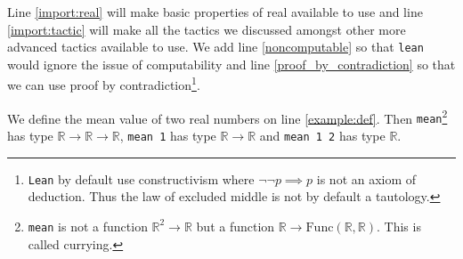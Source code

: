 \documentclass{report}
\theoremstyle{definition}
\begin{document}
Line \ref{import:real} will make basic properties of real available to use and line \ref{import:tactic} will make all the tactics we discussed amongst other more advanced tactics available to use. We add line \ref{noncomputable} so that {\tt \small lean} would ignore the issue of computability and line \ref{proof_by_contradiction} so that we can use proof by contradiction\footnote{{\tt \small Lean} by default use constructivism where $\neg\neg p\implies p$ is not an axiom of deduction. Thus the law of excluded middle is not by default a tautology.}. 

We define the mean value of two real numbers on line \ref{example:def}. Then {\tt \small mean}\footnote{{\tt \small mean} is not a function $\mathbb R^2\to\mathbb R$ but a function $\mathbb R\to\mathrm{Func}(\mathbb R,\mathbb R)$. This is called currying.} has type $\mathbb R\to \mathbb R\to \mathbb R$, {\tt \small mean 1} has type $\mathbb R\to \mathbb R$ and {\tt \small mean 1 2} has type $\mathbb R$. 
\end{document}
